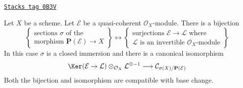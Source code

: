 \begin{lemma}
\label{divisors-lemma-conormal-sheaf-section-projective-bundle}
\href{https://stacks.math.columbia.edu/tag/0B3V}{\texttt{Stacks tag 0B3V}}

Let $X$ be a scheme. Let $\mathcal{E}$ be a quasi-coherent
$\mathcal{O}_X$-module. There is a bijection
$$
\left\{
\begin{matrix}
\text{sections }\sigma\text{ of the } \\
\text{morphism } \mathbf{P}(\mathcal{E}) \to X
\end{matrix}
\right\}
\leftrightarrow
\left\{
\begin{matrix}
\text{surjections }\mathcal{E} \to \mathcal{L}\text{ where} \\
\mathcal{L}\text{ is an invertible }\mathcal{O}_X\text{-module}
\end{matrix}
\right\}
$$
In this case $\sigma$ is a closed immersion and there is a canonical
isomorphism
$$
\Ker(\mathcal{E} \to \mathcal{L})
\otimes_{\mathcal{O}_X} \mathcal{L}^{\otimes -1}
\longrightarrow
\mathcal{C}_{\sigma(X)/\mathbf{P}(\mathcal{E})}
$$
Both the bijection and isomorphism are compatible with base change.
\end{lemma}

